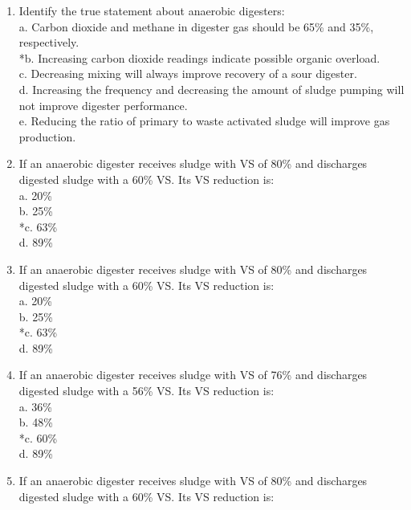 \documentclass{article}
\begin{document}
\begin{enumerate}
\item  Identify the true statement about anaerobic digesters: \\

a. Carbon dioxide and methane in digester gas should be 65\% and 35\%, respectively. \\
*b. Increasing carbon dioxide readings indicate possible organic overload. \\
c. Decreasing mixing will always improve recovery of a sour digester. \\
d. Increasing the frequency and decreasing the amount of sludge pumping will not improve digester performance. \\
e. Reducing the ratio of primary to waste activated sludge will improve gas production. \\

\item  If an anaerobic digester receives sludge with VS of 80\% and discharges digested sludge with a 60\% VS.  Its VS reduction is: \\

a. 20\% \\
b. 25\% \\
*c. 63\% \\
d. 89\% \\

\item  If an anaerobic digester receives sludge with VS of 80\% and discharges digested sludge with a 60\% VS.  Its VS reduction is: \\

a. 20\% \\
b. 25\% \\
*c. 63\% \\
d. 89\% \\

\item  If an anaerobic digester receives sludge with VS of 76\% and discharges digested sludge with a 56\% VS.  Its VS reduction is: \\

a. 36\% \\
b. 48\% \\
*c. 60\% \\
d. 89\% \\

\item  If an anaerobic digester receives sludge with VS of 80\% and discharges digested sludge with a 60\% VS.  Its VS reduction is: \\


\end{enumerate}
\end{document}
